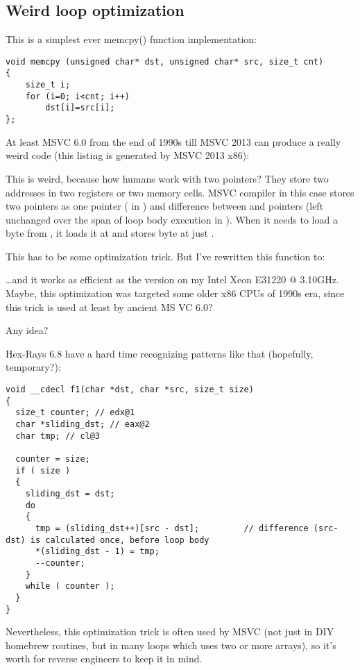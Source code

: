 \subsection{Weird loop optimization}

This is a simplest ever memcpy() function implementation:

\begin{lstlisting}[style=customc]
void memcpy (unsigned char* dst, unsigned char* src, size_t cnt)
{
	size_t i;
	for (i=0; i<cnt; i++)
		dst[i]=src[i];
};
\end{lstlisting}

At least MSVC 6.0 from the end of 1990s till MSVC 2013 can produce a really weird code (this listing is generated by MSVC 2013 x86):



This is weird, because how humans work with two pointers? They store two addresses in two registers or two memory cells.
MSVC compiler in this case stores two pointers as one pointer ( in \EAX) 
and difference between  and  pointers (left unchanged over the span of loop body execution in \ESI).
When it needs to load a byte from , it loads it at  and stores byte
at just .

This has to be some optimization trick. But I've rewritten this function to:



\dots and it works as efficient as the  version on my Intel Xeon E31220 @ 3.10GHz.
Maybe, this optimization was targeted some older x86 CPUs of 1990s era, since this trick is used at least by ancient MS VC 6.0?

Any idea?

Hex-Rays 6.8 have a hard time recognizing patterns like that (hopefully, temporary?):

\begin{lstlisting}[style=customc]
void __cdecl f1(char *dst, char *src, size_t size)
{
  size_t counter; // edx@1
  char *sliding_dst; // eax@2
  char tmp; // cl@3

  counter = size;
  if ( size )
  {
    sliding_dst = dst;
    do
    {
      tmp = (sliding_dst++)[src - dst];         // difference (src-dst) is calculated once, before loop body
      *(sliding_dst - 1) = tmp;
      --counter;
    }
    while ( counter );
  }
}
\end{lstlisting}

Nevertheless, this optimization trick is often used by MSVC (not just in \ac{DIY} homebrew  routines,
but in many loops which uses two or more arrays),
so it's worth for reverse engineers to keep it in mind.


